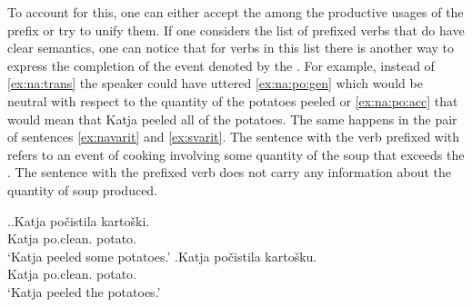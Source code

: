 %
%

To account for this, one can either accept the  among the productive usages of the prefix  or try to unify them. If one considers the list of prefixed verbs that do have clear  semantics, one can notice that for verbs in this list there is another way to express the completion of the event denoted by the . For example, instead of \ref{ex:na:trans} the speaker could have uttered \ref{ex:na:po:gen} which would be neutral with respect to the quantity of the potatoes peeled or \ref{ex:na:po:acc} that would mean that Katja peeled all of the potatoes. The same happens in the pair of sentences \ref{ex:navarit} and \ref{ex:svarit}. The sentence with the verb prefixed with  refers to an event of cooking involving some quantity of the soup that exceeds the . The sentence with the prefixed verb does not carry any information about the quantity of soup produced.

\ex.\label{ex:na:po}\ag.\label{ex:na:po:gen}Katja po\v{c}istila karto\v{s}ki.\\
Katja po.clean. potato.\\
\trans `Katja peeled some potatoes.'
\bg.\label{ex:na:po:acc}Katja po\v{c}istila karto\v{s}ku.\\
Katja po.clean. potato.\\
\trans `Katja peeled the potatoes.'

